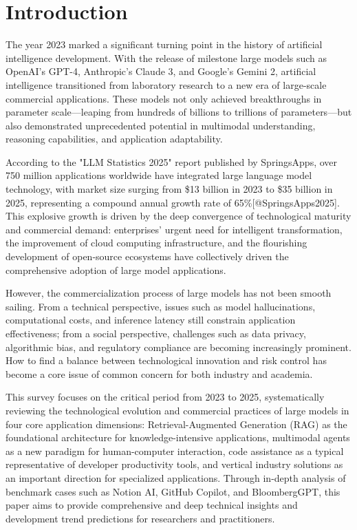 \documentclass{article}
\begin{document}
\section{Introduction}
The year 2023 marked a significant turning point in the history of artificial intelligence development. With the release of milestone large models such as OpenAI's GPT-4, Anthropic's Claude 3, and Google's Gemini 2, artificial intelligence transitioned from laboratory research to a new era of large-scale commercial applications. These models not only achieved breakthroughs in parameter scale—leaping from hundreds of billions to trillions of parameters—but also demonstrated unprecedented potential in multimodal understanding, reasoning capabilities, and application adaptability.

According to the "LLM Statistics 2025" report published by SpringsApps, over 750 million applications worldwide have integrated large language model technology, with market size surging from \$13 billion in 2023 to \$35 billion in 2025, representing a compound annual growth rate of 65\%[@SpringsApps2025]. This explosive growth is driven by the deep convergence of technological maturity and commercial demand: enterprises' urgent need for intelligent transformation, the improvement of cloud computing infrastructure, and the flourishing development of open-source ecosystems have collectively driven the comprehensive adoption of large model applications.

However, the commercialization process of large models has not been smooth sailing. From a technical perspective, issues such as model hallucinations, computational costs, and inference latency still constrain application effectiveness; from a social perspective, challenges such as data privacy, algorithmic bias, and regulatory compliance are becoming increasingly prominent. How to find a balance between technological innovation and risk control has become a core issue of common concern for both industry and academia.

This survey focuses on the critical period from 2023 to 2025, systematically reviewing the technological evolution and commercial practices of large models in four core application dimensions: Retrieval-Augmented Generation (RAG) as the foundational architecture for knowledge-intensive applications, multimodal agents as a new paradigm for human-computer interaction, code assistance as a typical representative of developer productivity tools, and vertical industry solutions as an important direction for specialized applications. Through in-depth analysis of benchmark cases such as Notion AI, GitHub Copilot, and BloombergGPT, this paper aims to provide comprehensive and deep technical insights and development trend predictions for researchers and practitioners.
\end{document}
